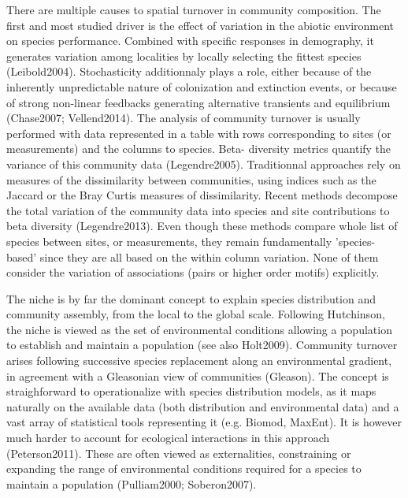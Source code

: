 \documentclass[12pt]{article}
\begin{document}
There are multiple causes to spatial turnover in community composition. The
first and most studied driver is the effect of variation in the abiotic
environment on species performance. Combined with specific responses in
demography, it generates variation among localities by locally selecting the
fittest species (Leibold2004). Stochasticity additionnaly plays a role, either
because of the inherently unpredictable nature of colonization and extinction
events, or because of strong non-linear feedbacks generating alternative
transients and equilibrium (Chase2007; Vellend2014). The analysis of community
turnover is usually performed with data represented in a table with rows
corresponding to sites (or measurements) and the columns to species. Beta-
diversity metrics quantify the variance of this community data (Legendre2005).
Traditionnal approaches rely on measures of the dissimilarity between
communities, using indices such as the Jaccard or the Bray Curtis measures of
dissimilarity. Recent methods decompose the total variation of the community
data into species and site contributions to beta diversity (Legendre2013).
Even though these methods compare whole list of species between sites, or
measurements, they remain fundamentally 'species-based' since they are all
based on the within column variation. None of them consider the variation of
associations (pairs or higher order motifs) explicitly.

The niche is by far the dominant concept to explain species distribution and
community assembly, from the local to the global scale. Following Hutchinson,
the niche is viewed as the set of environmental conditions allowing a
population to establish and maintain a population (see also Holt2009).
Community turnover arises following successive species replacement along an
environmental gradient, in agreement with a Gleasonian view of communities
(Gleason). The concept is straighforward to operationalize with species
distribution models, as it maps naturally on the available data (both
distribution and environmental data) and a vast array of statistical tools
representing it (e.g. Biomod, MaxEnt). It is however much harder to account
for ecological interactions in this approach (Peterson2011). These are often
viewed as externalities, constraining or expanding the range of environmental
conditions required for a species to maintain a population (Pulliam2000;
Soberon2007).
\end{document}
